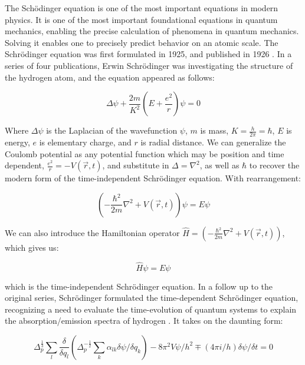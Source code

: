 The Sch\"odinger equation is one of the most important equations in
modern physics.
It is one of the most important foundational equations in quantum mechanics,
enabling the precise calculation of phenomena in quantum mechanics. Solving
it enables one to precisely predict behavior on an atomic scale. The
Schr\"odinger
equation was first formulated in 1925, and published in 1926
\cite{schrodinger1}. In a series of four publications, Erwin Schr\"odinger was
investigating the structure of the hydrogen atom, and the equation appeared as
follows:

\begin{equation}
  \Delta \psi + \frac{2m}{K^2}\left( E + \frac{e^2}{r} \right)\psi = 0
\end{equation}

Where $\Delta \psi$ is the Laplacian of the wavefunction $\psi$, $m$ is mass,
$K = \frac{h}{2\pi} = \hbar$, $E$ is energy, $e$ is elementary charge, and $r$
is radial distance. We can generalize the Coulomb potential as any potential
function which may be position and time dependent, $\frac{e^2}{r} =
-V(\vec r, t)$,
and substitute in $\Delta = \nabla^2$,
as well as $\hbar$ to recover the modern form of the time-independent
Schr\"odinger equation. With rearrangement:

\begin{equation}
  \left(-\frac{\hbar^2}{2m}\nabla^2 + V(\vec r, t)\right) \psi = E\psi
\end{equation}

We can also introduce the Hamiltonian operator $\hat H =
\left(-\frac{\hbar^2}{2m}\nabla^2 + V(\vec r, t)\right)$, which gives us:

\begin{equation}
  \hat H \psi = E\psi
  \label{eq:tise}
\end{equation}

which is the time-independent Schr\"odinger equation. In a follow up to the
original series, Schr\"odinger formulated the time-dependent Schr\"odinger
equation, recognizing a need to evaluate the time-evolution of quantum systems
to explain the absorption/emission spectra of hydrogen
\cite{schrodinger2}. It takes on the
daunting form:

\begin{equation}
  \Delta _p^{\frac{1}{3}} \sum_l \frac{\delta}{\delta q_l}
  \left(\Delta_p^{-\frac{1}{2}}\sum_k\alpha_{lk} \delta\psi/\delta q_k\right)
  - 8\pi^2V\psi/h^2 \mp (4\pi i/ h)\delta \psi / \delta t = 0
\end{equation}

